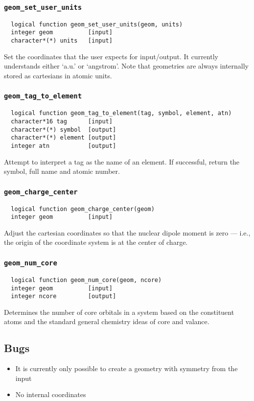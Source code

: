 \subsubsection{{\tt geom\_set\_user\_units}}
\begin{verbatim}
  logical function geom_set_user_units(geom, units)
  integer geom          [input]
  character*(*) units   [input]
\end{verbatim}
Set the coordinates that the user expects for input/output.  It
currently understands either `a.u.' or `angstrom'.  Note that
geometries are always internally stored as cartesians in atomic units.

\subsubsection{{\tt geom\_tag\_to\_element}}
\begin{verbatim}
  logical function geom_tag_to_element(tag, symbol, element, atn)
  character*16 tag      [input]
  character*(*) symbol  [output]
  character*(*) element [output]
  integer atn           [output]
\end{verbatim}
Attempt to interpret a tag as the name of an element.  If successful,
return the symbol, full name and atomic number.

\subsubsection{{\tt geom\_charge\_center}}
\begin{verbatim}
  logical function geom_charge_center(geom)
  integer geom          [input]
\end{verbatim}
Adjust the cartesian coordinates so that the nuclear dipole moment is
zero --- i.e., the origin of the coordinate system is at the center of
charge.

\subsubsection{{\tt geom\_num\_core}}
\begin{verbatim}
  logical function geom_num_core(geom, ncore)
  integer geom          [input]
  integer ncore         [output]
\end{verbatim}
Determines the number of core orbitals in a system based on the
constituent atoms and the standard general chemistry ideas of core and
valance.

\subsection{Bugs}

\begin{itemize}
\item It is currently only possible to create a geometry with symmetry
  from the input
\item No internal coordinates
\end{itemize}


